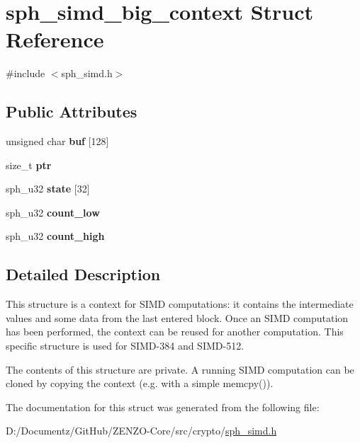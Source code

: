 \hypertarget{structsph__simd__big__context}{}\section{sph\+\_\+simd\+\_\+big\+\_\+context Struct Reference}
\label{structsph__simd__big__context}


{\ttfamily \#include $<$sph\+\_\+simd.\+h$>$}

\subsection*{Public Attributes}
\begin{DoxyCompactItemize}
\item 
\mbox{\label{structsph__simd__big__context_a4d67b9491c7243d7e372de7ca01a717f}} 
unsigned char {\bfseries buf} \mbox{[}128\mbox{]}
\item 
\mbox{\label{structsph__simd__big__context_a0f5cd2f56abcf6ab9e0a6177e970814f}} 
size\+\_\+t {\bfseries ptr}
\item 
\mbox{\label{structsph__simd__big__context_ac1948fd0308eb6281db68aaa9ee4178e}} 
sph\+\_\+u32 {\bfseries state} \mbox{[}32\mbox{]}
\item 
\mbox{\label{structsph__simd__big__context_a0869d428ed186efa3137783052da74d4}} 
sph\+\_\+u32 {\bfseries count\+\_\+low}
\item 
\mbox{\label{structsph__simd__big__context_ae7c05aa3d59f60bd4d06b6abe04e7a7b}} 
sph\+\_\+u32 {\bfseries count\+\_\+high}
\end{DoxyCompactItemize}


\subsection{Detailed Description}
This structure is a context for S\+I\+MD computations\+: it contains the intermediate values and some data from the last entered block. Once an S\+I\+MD computation has been performed, the context can be reused for another computation. This specific structure is used for S\+I\+M\+D-\/384 and S\+I\+M\+D-\/512.

The contents of this structure are private. A running S\+I\+MD computation can be cloned by copying the context (e.\+g. with a simple {\ttfamily memcpy()}). 

The documentation for this struct was generated from the following file\+:\begin{DoxyCompactItemize}
\item 
D\+:/\+Documentz/\+Git\+Hub/\+Z\+E\+N\+Z\+O-\/\+Core/src/crypto/\mbox{\hyperlink{sph__simd_8h}{sph\+\_\+simd.\+h}}\end{DoxyCompactItemize}
